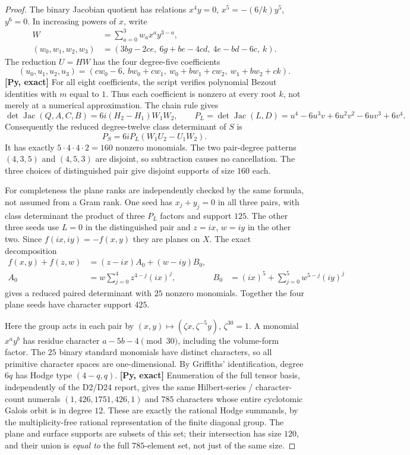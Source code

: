 \documentclass[11pt]{amsart}
\theoremstyle{remark}\newtheorem{remark}[theorem]{Remark}
\begin{document}
\begin{proof}
The binary Jacobian quotient has relations $x^4y=0$,
$x^5=-(6/k)y^5$, $y^6=0$. In increasing powers of $x$, write
\begin{align*}
 W&=\sum_{a=0}^3w_ax^ay^{3-a},\\
 (w_0,w_1,w_2,w_3)&=(3bg-2ce,\ 6g+be-4cd,\ 4e-bd-6c,\ k).
\end{align*}
The reduction $U=HW$ has the four degree-five coefficients
\[
 (u_0,u_1,u_2,u_3)=(cw_0-6,\ bw_0+cw_1,\
 w_0+bw_1+cw_2,\ w_1+bw_2+ck).
\]
\textbf{[Py, exact]} For all eight coefficients, the script verifies
polynomial Bezout identities with $m$ equal to $1$. Thus each coefficient
is nonzero at every root $k$, not merely at a numerical approximation.
The chain rule gives
\[
 \det\operatorname{Jac}(Q,A,C,B)=6i(H_2-H_1)W_1W_2,
 \qquad P_L=\det\operatorname{Jac}(L,D)
 =u^4-6u^3v+6u^2v^2-6uv^3+6v^4.
\]
Consequently the reduced degree-twelve class determinant of $S$ is
\[
 P_S=6iP_L(W_1U_2-U_1W_2).
\]
It has exactly $5\cdot4\cdot4\cdot2=160$ nonzero monomials.
The two pair-degree patterns $(4,3,5)$ and $(4,5,3)$ are disjoint,
so subtraction causes no cancellation. The three choices of distinguished
pair give disjoint supports of size $160$ each.

For completeness the plane ranks are independently checked by the same
formula, not assumed from a Gram rank. One seed has $x_j+y_j=0$ in all
three pairs, with class determinant the product of three $P_L$ factors
and support $125$. The other three seeds use $L=0$ in the distinguished
pair and $z=ix$, $w=iy$ in the other two. Since $f(ix,iy)=-f(x,y)$ they
are planes on $X$. The exact decomposition
\begin{align*}
 f(x,y)+f(z,w)&=(z-ix)A_0+(w-iy)B_0,\\
 A_0&=w\sum_{j=0}^4z^{4-j}(ix)^j,
 &B_0&=(ix)^5+\sum_{j=0}^5w^{5-j}(iy)^j
\end{align*}
gives a reduced paired determinant with $25$ nonzero monomials.
Together the four plane seeds have character support $425$.

Here the group acts in each pair by $(x,y)\mapsto(\zeta x,\zeta^{-5}y)$,
$\zeta^{30}=1$. A monomial $x^ay^b$ has residue character
$a-5b-4\pmod {30}$, including the volume-form factor.
The $25$ binary standard monomials have distinct characters, so all
primitive character spaces are one-dimensional. By Griffiths' identification,
degree $6q$ has Hodge type $(4-q,q)$.
\textbf{[Py, exact]} Enumeration of the full tensor basis, independently
of the D2/D24 report, gives the same Hilbert-series / character-count numerals $(1,426,1751,426,1)$ and
$785$ characters whose entire cyclotomic Galois orbit is in degree $12$.
These are exactly the rational Hodge summands, by the multiplicity-free
rational representation of the finite diagonal group.
The plane and surface supports are subsets of this set; their intersection
has size $120$, and their union is \emph{equal to} the full $785$-element
set, not just of the same size.


\end{proof}
\end{document}
